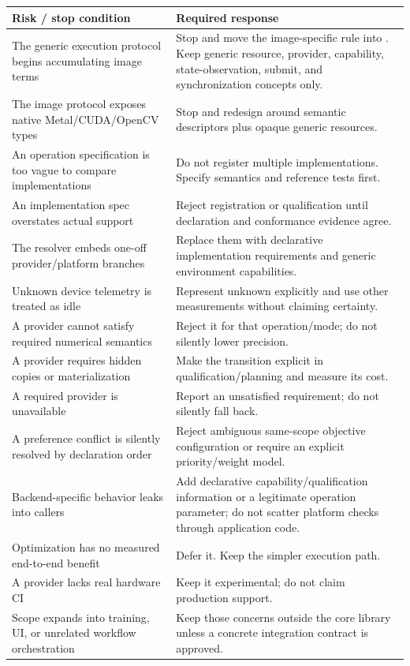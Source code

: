 \begin{longtable}{@{}L{0.22\textwidth}p{0.69\textwidth}@{}}
\toprule
\textbf{Risk / stop condition} & \textbf{Required response} \\
\midrule
The generic execution protocol begins accumulating image terms & Stop and move the image-specific rule into \IPP{}. Keep generic resource, provider, capability, state-observation, submit, and synchronization concepts only. \\
The image protocol exposes native Metal/CUDA/OpenCV types & Stop and redesign around semantic descriptors plus opaque generic resources. \\
An operation specification is too vague to compare implementations & Do not register multiple implementations. Specify semantics and reference tests first. \\
An implementation spec overstates actual support & Reject registration or qualification until declaration and conformance evidence agree. \\
The resolver embeds one-off provider/platform branches & Replace them with declarative implementation requirements and generic environment capabilities. \\
Unknown device telemetry is treated as idle & Represent unknown explicitly and use other measurements without claiming certainty. \\
A provider cannot satisfy required numerical semantics & Reject it for that operation/mode; do not silently lower precision. \\
A provider requires hidden copies or materialization & Make the transition explicit in qualification/planning and measure its cost. \\
A required provider is unavailable & Report an unsatisfied requirement; do not silently fall back. \\
A preference conflict is silently resolved by declaration order & Reject ambiguous same-scope objective configuration or require an explicit priority/weight model. \\
Backend-specific behavior leaks into callers & Add declarative capability/qualification information or a legitimate operation parameter; do not scatter platform checks through application code. \\
Optimization has no measured end-to-end benefit & Defer it. Keep the simpler execution path. \\
A provider lacks real hardware CI & Keep it experimental; do not claim production support. \\
Scope expands into training, UI, or unrelated workflow orchestration & Keep those concerns outside the core library unless a concrete integration contract is approved. \\
\bottomrule
\end{longtable}

